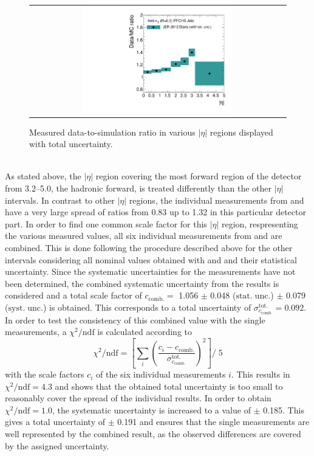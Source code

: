 \begin{figure}[!p]
  \centering
  \begin{tabular}{c}
                \includegraphics[width=0.6\textwidth]{figures/JER_2012_final_combination_v1.pdf}
  \end{tabular}
  \caption{Measured data-to-simulation ratio in various $|\eta|$ regions displayed with total uncertainty.}
  \label{fig:result_2012}
\end{figure}
\\
As stated above, the $|\eta|$ region covering the most forward region of the detector from 3.2--5.0, \ie the hadronic forward, is treated differently than the other $|\eta|$ intervals. In contrast to other $|\eta|$ regions, the individual measurements from \pythia and \herwig have a very large spread of ratios from 0.83 up to 1.32 in this particular detector part. In order to find one common scale factor for this $|\eta|$ region, respresenting the various measured values, all six individual measurements from \pythia and \herwig are combined. This is done following the procedure described above for the other intervals considering all nominal values obtained with \pythia and \herwig and their statistical uncertainty. Since the systematic uncertainties for the \herwig measurements have not been determined, the combined systematic uncertainty from the \pythia results is considered and a total scale factor of $c_\mathrm{comb.} =$ 1.056 $\pm$ 0.048 ($\mathrm{stat.\; unc.}$) $\pm$ 0.079 ($\mathrm{syst. \; unc.}$) is obtained. This corresponds to a total uncertainty of $\sigma^\mathrm{tot.}_{c_\mathrm{comb.}} = 0.092$. In order to test the consistency of this combined value with the single measurements, a $\chi^2/\mathrm{ndf}$ is calculated according to
\begin{equation}
\chi^2/\mathrm{ndf} = \left[\sum_i \left ( \frac{c_i-c_\mathrm{comb.}}{\sigma^\mathrm{tot.}_{c_\mathrm{comb.}}} \right)^2 \right] /\; 5 
\end{equation}
with the scale factors $c_i$ of the six individual measurements $i$. This results in $\chi^2/\mathrm{ndf} = 4.3$ and shows that the obtained total uncertainty is too small to reasonably cover the spread of the individual results. In order to obtain $\chi^2/\mathrm{ndf} = 1.0$, the systematic uncertainty is increased to a value of $\pm$ 0.185. This gives a total uncertainty of $\pm$ 0.191 and ensures that the single measurements are well represented by the combined result, as the observed differences are covered by the assigned uncertainty.\\
